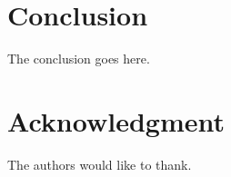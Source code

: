 \documentclass[conference]{IEEEtran}
\begin{document}


\section{Conclusion}\label{sec:conclusion}
The conclusion goes here.

\section*{Acknowledgment}

The authors would like to thank.



\end{document}
